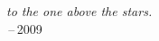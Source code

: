\thispagestyle{empty}
{}

\vspace*{3cm}


\begin{center}
	\emph{to the one above the stars.} \\ \,--\,2009
\end{center}
